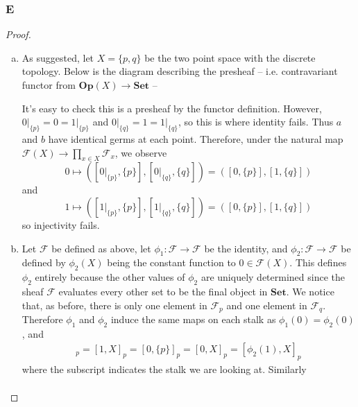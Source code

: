\documentclass{article}
\newcommand{\fF}{\mathscr{F}}
\newcommand{\Set}{\mathbf{Set}} %
\newcommand{\Op}{\mathbf{Op}} %
\DeclareMathOperator{\res}{\mathrm{res}}
\let\emptyset\varnothing
\begin{document}
\subsubsection{E}\label{2.4.E}
\begin{proof}
    \begin{enumerate}[(a)]
        \item As suggested, let $X=\{p,q\}$ be the two point space with the discrete topology. Below is the diagram describing the presheaf -- i.e. contravariant functor from $\Op(X)\to \Set$ -- 
        \begin{center}
        \end{center}
        It's easy to check this is a presheaf by the functor definition. However, $0\vert_{\{p\}}=0=1\vert_{\{p\}}$ and $0\vert_{\{q\}}=1=1\vert_{\{q\}}$, so this is where identity fails. Thus $a$ and $b$ have identical germs at each point. Therefore, under the natural map $\fF(X)\to \prod_{x\in X} \fF_x$, we observe
        \[
        0\mapsto ([0\vert_{\{p\}},\{p\}],[0\vert_{\{q\}},\{q\}])=([0,\{p\}],[1,\{q\}])
        \]
        and
        \[
        1\mapsto ([1\vert_{\{p\}},\{p\}],[1\vert_{\{q\}},\{q\}])=([0,\{p\}],[1,\{q\}])
        \]
        so injectivity fails.
        \item 
        Let $\fF$ be defined as above, let $\phi_1:\fF\to \fF$ be the identity, and $\phi_2:\fF\to \fF$ be defined by $\phi_2(X)$ being the constant function to $0\in \fF(X)$. This defines $\phi_2$ entirely because the other values of $\phi_2$ are uniquely determined since the sheaf $\fF$ evaluates every other set to be the final object in $\Set$. We notice that, as before, there is only one element in $\fF_p$ and one element in $\fF_q$. Therefore $\phi_1$ and $\phi_2$ induce the same maps on each stalk as $\phi_1(0)=\phi_2(0)$, and
        \begin{align*}
            [\phi_1(1),X]_p=[1,X]_p=[0,\{p\}]_p=[0,X]_p=[\phi_2(1),X]_p
        \end{align*}
        where the subscript indicates the stalk we are looking at. Similarly
        \begin{align*}

\end{align*}
\end{enumerate}
\end{proof}
\end{document}
